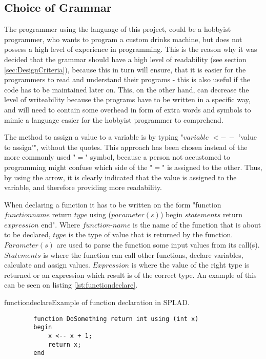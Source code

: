 \subsection{Choice of Grammar}
\label{sec:grammarchoice}
The programmer using the language of this project, could be a hobbyist programmer, who wants to program a custom drinks machine, but does not possess a high level of experience in programming. This is the reason why it was decided that the grammar should have a high level of readability (see section \ref{sec:DesignCriteria}), because this in turn will ensure, that it is easier for the programmers to read and understand their programs - this is also useful if the code has to be maintained later on. This, on the other hand, can decrease the level of writeability because the programs have to be written in a specific way, and will need to contain some overhead in form of extra words and symbols to mimic a language easier for the hobbyist programmer to comprehend.

The method to assign a value to a variable is by typing "$variable$ $<-\,-$ 'value to assign'", without the quotes. This approach has been chosen instead of the more commonly used "$=$" symbol, because a person not accustomed to programming might confuse which side of the "$=$" is assigned to the other. Thus, by using the arrow, it is clearly indicated that the value is assigned to the variable, and therefore providing more readability.

When declaring a function it has to be written on the form "function $functionname$ return $type$ using ($parameter(s)$) begin $statements$ return $expression$ end". Where $function$-$name$ is the name of the function that is about to be declared, $type$ is the type of value that is returned by the function. $Parameter(s)$ are used to parse the function some input values from its call(s). $Statements$ is where the function can call other functions, declare variables, calculate and assign values. $Expression$ is where the value of the right type is returned or an expression which result is of the correct type.
An example of this can be seen on listing \ref{lst:functiondeclare}.

\begin{code}{functiondeclare}{Example of function declaration in SPLAD.}
	\begin{lstlisting}
		function DoSomething return int using (int x)
		begin
			x <-- x + 1;
			return x;
		end
	\end{lstlisting}
\end{code}


